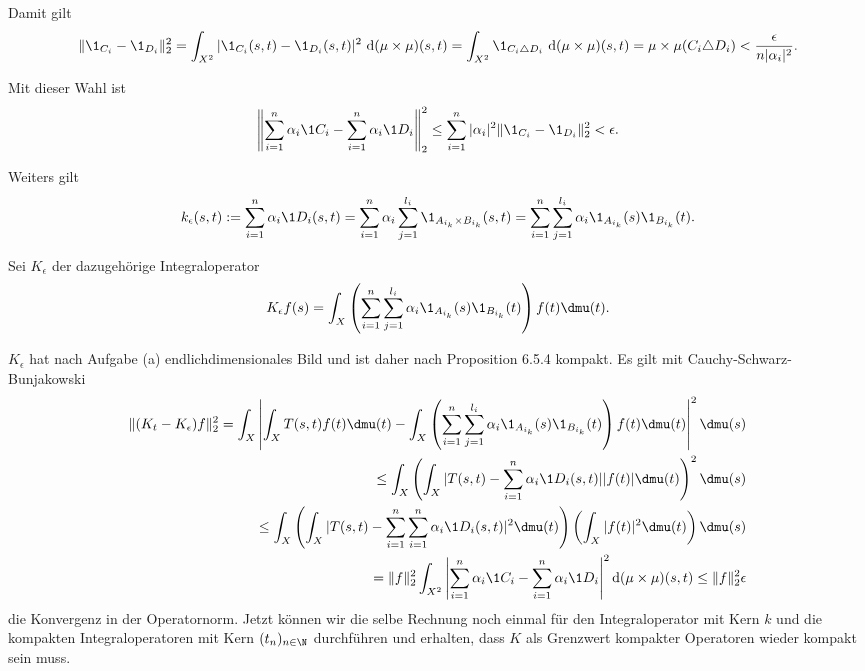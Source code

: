 \begin{solution}
\begin{enumerate}[label = (\alph*)]
Damit gilt
\begin{align*}
    \|\1_{C_i} - \1_{D_i}\|_2^2 = \int_{X^2} |\1_{C_i}(s,t) - \1_{D_i}(s,t)|^2
     ~\mathrm{d}(\mu\times\mu)(s,t) = \int_{X^2} \1_{C_i \triangle D_i}~\mathrm{d}(\mu\times\mu)(s,t) =
     \mu\times\mu(C_i \triangle D_i) < \/
     \frac{\epsilon}{n|\alpha_i|^2}.
\end{align*}


Mit dieser Wahl ist
\begin{align*}
    \left\| \sum_{i = 1}^n \alpha_i \1C_i -
    \sum_{i = 1}^n \alpha_i \1D_i\right\|_2^2
    \leq \sum_{i=1}^{n} |\alpha_{i}|^2 \|\1_{C_{i}} - \1_{D_{i}} \|_2^2 < \epsilon.
\end{align*}

Weiters gilt
\begin{align*}
    k_{\epsilon}(s,t) := \sum_{i = 1}^n \alpha_i \1D_i(s,t)
    = \sum_{i=1}^{n} \alpha_{i} \sum_{j=1}^{l_{i}}  \1_{A_{i_k} \times B_{i_k}}(s,t)
    = \sum_{i=1}^{n} \sum_{j=1}^{l_{i}}   \alpha_{i} \1_{A_{i_k}}(s) \1_{B_{i_k}}(t).
\end{align*}

Sei $K_{\epsilon}$ der dazugehörige Integraloperator
\begin{align*}
  K_{\epsilon} f(s) = \int_X \left(\sum_{i=1}^{n} \sum_{j=1}^{l_{i}}   \alpha_{i} \1_{A_{i_k}}(s) \1_{B_{i_k}}(t)\right) f(t) \dmu(t).
\end{align*}

$K_{\epsilon}$ hat nach Aufgabe (a) endlichdimensionales Bild und ist daher nach Proposition 6.5.4 kompakt. Es gilt mit Cauchy-Schwarz-Bunjakowski
\begin{align*}
    \|(K_t-K_{\epsilon}) f\|_2^2 = \int_X \left| \int_X T(s,t) f(t) \dmu(t) - \int_X \left(\sum_{i=1}^{n} \sum_{j=1}^{l_{i}}   \alpha_{i} \1_{A_{i_k}}(s) \1_{B_{i_k}}(t)\right) f(t) \dmu(t) \right|^2 \dmu(s) \\
    \leq \int_X \left( \int_X |T(s,t) - \sum_{i = 1}^n \alpha_i \1D_i(s,t)| |f(t)| \dmu(t)\right)^2 \dmu(s) \\
    \leq \int_X \left(\int_X |T(s,t) - \sum_{i=1}^{n} \sum_{i = 1}^n \alpha_i \1D_i(s,t)|^2 \dmu(t)\right) \left(\int_X |f(t)|^2 \dmu(t)\right) \dmu(s) \\
    = \|f\|_2^2\int_{X^2} \left| \sum_{i = 1}^n \alpha_i \1C_i -
    \sum_{i = 1}^n \alpha_i \1D_i\right|^2 \mathrm{d}(\mu\times\mu)(s,t) \leq \|f\|_2^2\epsilon
\end{align*}
die Konvergenz in der Operatornorm.
Jetzt können wir die selbe Rechnung noch einmal für den Integraloperator mit Kern $k$
und die kompakten Integraloperatoren mit Kern $(t_n)_{n \in \N}$ durchführen und
erhalten, dass $K$ als Grenzwert kompakter Operatoren wieder kompakt sein muss.

\end{enumerate}

\end{solution}
